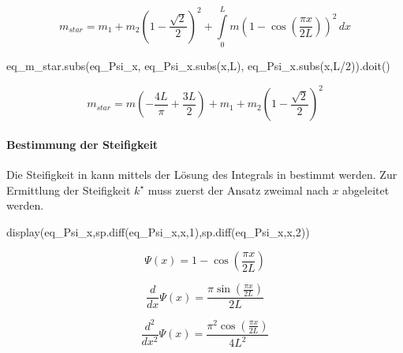 \documentclass[
  letterpaper,
  DIV=11,
  numbers=noendperiod]{scrartcl}
\let\oldparagraph\paragraph
\renewcommand{\paragraph}[1]{\oldparagraph{#1}\mbox{}}
\newenvironment{Shaded}{\begin{snugshade}}{\end{snugshade}}
\newcommand{\DecValTok}[1]{\textcolor[rgb]{0.68,0.00,0.00}{#1}}
\newcommand{\NormalTok}[1]{\textcolor[rgb]{0.00,0.23,0.31}{#1}}
\newcommand{\OperatorTok}[1]{\textcolor[rgb]{0.37,0.37,0.37}{#1}}
\begin{document}
\begin{equation}m_{star} = m_{1} + m_{2} \left(1 - \frac{\sqrt{2}}{2}\right)^{2} + \int\limits_{0}^{L} m \left(1 - \cos{\left(\frac{\pi x}{2 L} \right)}\right)^{2}\, dx\end{equation}

\begin{Shaded}
\begin{Highlighting}[]
\NormalTok{eq\_m\_star.subs(eq\_Psi\_x, eq\_Psi\_x.subs(x,L), eq\_Psi\_x.subs(x,L}\OperatorTok{/}\DecValTok{2}\NormalTok{)).doit()}
\end{Highlighting}
\end{Shaded}

\begin{equation}m_{star} = m \left(- \frac{4 L}{\pi} + \frac{3 L}{2}\right) + m_{1} + m_{2} \left(1 - \frac{\sqrt{2}}{2}\right)^{2}\end{equation}

\hypertarget{bestimmung-der-steifigkeit}{%
\paragraph{Bestimmung der
Steifigkeit}\label{bestimmung-der-steifigkeit}}

Die Steifigkeit in kann mittels der Lösung des Integrals in bestimmt
werden. Zur Ermittlung der Steifigkeit \(k^\star\) muss zuerst der
Ansatz zweimal nach \(x\) abgeleitet werden.

\begin{Shaded}
\begin{Highlighting}[]
\NormalTok{display(eq\_Psi\_x,sp.diff(eq\_Psi\_x,x,}\DecValTok{1}\NormalTok{),sp.diff(eq\_Psi\_x,x,}\DecValTok{2}\NormalTok{))}
\end{Highlighting}
\end{Shaded}

\begin{equation}\Psi{\left(x \right)} = 1 - \cos{\left(\frac{\pi x}{2 L} \right)}\end{equation}

\begin{equation}\frac{d}{d x} \Psi{\left(x \right)} = \frac{\pi \sin{\left(\frac{\pi x}{2 L} \right)}}{2 L}\end{equation}

\begin{equation}\frac{d^{2}}{d x^{2}} \Psi{\left(x \right)} = \frac{\pi^{2} \cos{\left(\frac{\pi x}{2 L} \right)}}{4 L^{2}}\end{equation}
\end{document}
